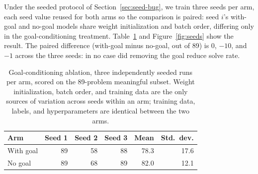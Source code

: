 \documentclass[11pt]{article}
\numberwithin{equation}{section}
\newcommand{\good}{89}
\begin{document}
Under the seeded protocol of Section~\ref{sec:seed-bug}, we train three seeds per arm, each seed value reused for both arms so the comparison is paired: seed $i$'s with-goal and no-goal models share weight initialization and batch order, differing only in the goal-conditioning treatment. Table~\ref{tab:ablation} and Figure~\ref{fig:seeds} show the result. The paired difference (with-goal minus no-goal, out of \good{}) is $0$, $-10$, and $-1$ across the three seeds: in no case did removing the goal reduce solve rate.

\begin{table}[t]
\centering
\small
\begin{tabular}{@{}lrrrrr@{}}
\toprule
Arm & Seed 1 & Seed 2 & Seed 3 & Mean & Std.\ dev. \\
\midrule
With goal & 89 & 58 & 88 & 78.3 & 17.6 \\
No goal   & 89 & 68 & 89 & 82.0 & 12.1 \\
\bottomrule
\end{tabular}
\caption{Goal-conditioning ablation, three independently seeded runs per arm, scored on the \good{}-problem meaningful subset. Weight initialization, batch order, and training data are the only sources of variation across seeds within an arm; training data, labels, and hyperparameters are identical between the two arms.}
\label{tab:ablation}
\end{table}
\end{document}
